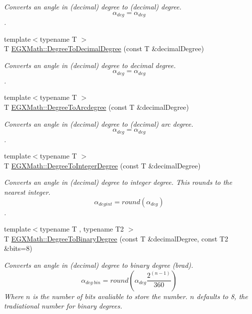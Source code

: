 \begin{DoxyCompactItemize}
\begin{DoxyCompactList}\small\item\em Converts an angle in (decimal) degree to (decimal) degree. \[\alpha_{deg}=\alpha_{deg}\]. \end{DoxyCompactList}\item 
{\footnotesize template$<$typename T $>$ }\\T \mbox{\hyperlink{group___e_g_x_math-_angle_conversions-_degree_ga568afc1d436d425bf5d4edea584aee08}{E\+G\+X\+Math\+::\+Degree\+To\+Decimal\+Degree}} (const T \&decimal\+Degree)
\begin{DoxyCompactList}\small\item\em Converts an angle in (decimal) degree to decimal degree. \[\alpha_{deg}=\alpha_{deg}\]. \end{DoxyCompactList}\item 
{\footnotesize template$<$typename T $>$ }\\T \mbox{\hyperlink{group___e_g_x_math-_angle_conversions-_degree_gac1b5f3b68f66c77a6df4ceef842c9b19}{E\+G\+X\+Math\+::\+Degree\+To\+Arcdegree}} (const T \&decimal\+Degree)
\begin{DoxyCompactList}\small\item\em Converts an angle in (decimal) degree to (decimal) arc degree. \[\alpha_{deg}=\alpha_{deg}\]. \end{DoxyCompactList}\item 
{\footnotesize template$<$typename T $>$ }\\T \mbox{\hyperlink{group___e_g_x_math-_angle_conversions-_degree_gaabd20f21be3c18ee423d0bc1a677c6f6}{E\+G\+X\+Math\+::\+Degree\+To\+Integer\+Degree}} (const T \&decimal\+Degree)
\begin{DoxyCompactList}\small\item\em Converts an angle in (decimal) degree to integer degree. This rounds to the nearest integer. \[\alpha_{deg int}=round(\alpha_{deg})\]. \end{DoxyCompactList}\item 
{\footnotesize template$<$typename T , typename T2 $>$ }\\T \mbox{\hyperlink{group___e_g_x_math-_angle_conversions-_degree_gacd1e3dc5194e89426a899a7cac4874f8}{E\+G\+X\+Math\+::\+Degree\+To\+Binary\+Degree}} (const T \&decimal\+Degree, const T2 \&bits=8)
\begin{DoxyCompactList}\small\item\em Converts an angle in (decimal) degree to binary degree (brad). \[\alpha_{deg\ bin}=round(\alpha_{deg}\frac{2^{(n-1)}}{360})\] Where $n$ is the number of bits avaliable to store the number. $n$ defaults to 8, the tradiational number for binary degrees. \end{DoxyCompactList}\item 

\end{DoxyCompactItemize}
